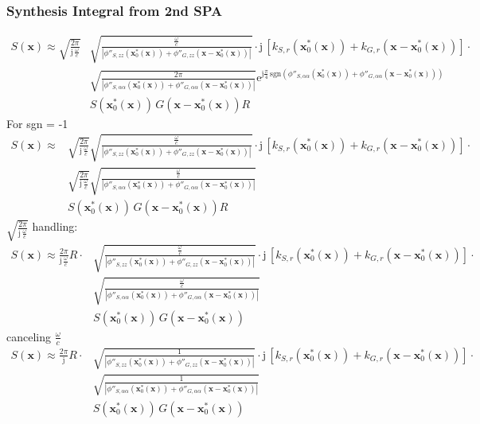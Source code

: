 \documentclass[a4paper,BCOR=15mm,10pt,twoside]{scrartcl}
\newcommand\e{\mathrm{e}}  %
\newcommand\im{\mathrm{j}}  %
\newcommand\wc{\frac{\omega}{c}}  %
\newcommand\jwc{\im\,\frac{\omega}{c}}  %
\newcommand\azx{\alpha}  %
\renewcommand{\vec}[1]{\mathbf{#1}}  %
\begin{document}
\subsubsection{Synthesis Integral from 2nd SPA}
\begin{align}
S(\vec{x}) \approx \sqrt{\frac{2\pi}{\jwc}}  
&
\sqrt{\frac{\wc}{|\phi''_{S,zz}(\vec{x}_0^*(\vec{x}))+\phi''_{G,zz}(\vec{x}-\vec{x}_0^*(\vec{x}))|}} 
\cdot \im \, \left[
k_{S,r}(\vec{x}_0^*(\vec{x})) + k_{G,r}(\vec{x} - \vec{x}_0^*(\vec{x}))
\right]\cdot\nonumber\\
&
\sqrt{\frac{2\pi}{|\phi''_{S,\azx\azx}(\vec{x}_0^*(\vec{x}))+\phi''_{G,\azx\azx}(\vec{x}-\vec{x}_0^*(\vec{x}))|}}
\e^{\im \frac{\pi}{4}\,\mathrm{sgn}(\phi''_{S,\azx\azx}(\vec{x}_0^*(\vec{x}))+\phi''_{G,\azx\azx}(\vec{x}-\vec{x}_0^*(\vec{x})))}\nonumber\\
&
S(\vec{x}_0^*(\vec{x}))\,G(\vec{x}-\vec{x}_0^*(\vec{x})) R
\end{align}
For sgn = -1
\begin{align}
S(\vec{x}) \approx 
&
\sqrt{\frac{2\pi}{\jwc}}  
\sqrt{\frac{\wc}{|\phi''_{S,zz}(\vec{x}_0^*(\vec{x}))+\phi''_{G,zz}(\vec{x}-\vec{x}_0^*(\vec{x}))|}} 
\cdot \im \, \left[
k_{S,r}(\vec{x}_0^*(\vec{x})) + k_{G,r}(\vec{x} - \vec{x}_0^*(\vec{x}))
\right]\cdot\nonumber\\
&
\sqrt{\frac{2\pi}{\jwc}}
\sqrt{\frac{\wc}{|\phi''_{S,\azx\azx}(\vec{x}_0^*(\vec{x}))+\phi''_{G,\azx\azx}(\vec{x}-\vec{x}_0^*(\vec{x}))|}}\nonumber\\
&
S(\vec{x}_0^*(\vec{x}))\,G(\vec{x}-\vec{x}_0^*(\vec{x})) R
\end{align}
$\sqrt{\frac{2\pi}{\jwc}}$ handling:
\begin{align}
S(\vec{x}) \approx \frac{2\pi}{\jwc}R \cdot
&  
\sqrt{\frac{\wc}{|\phi''_{S,zz}(\vec{x}_0^*(\vec{x}))+\phi''_{G,zz}(\vec{x}-\vec{x}_0^*(\vec{x}))|}} 
\cdot \im \, \left[
k_{S,r}(\vec{x}_0^*(\vec{x})) + k_{G,r}(\vec{x} - \vec{x}_0^*(\vec{x}))
\right]\cdot\nonumber\\
&
\sqrt{\frac{\wc}{|\phi''_{S,\azx\azx}(\vec{x}_0^*(\vec{x}))+\phi''_{G,\azx\azx}(\vec{x}-\vec{x}_0^*(\vec{x}))|}}\nonumber\\
&
S(\vec{x}_0^*(\vec{x}))\,G(\vec{x}-\vec{x}_0^*(\vec{x}))
\end{align}
canceling $\wc$ 
\begin{align}
S(\vec{x}) \approx \frac{2\pi}{\im}R \cdot
&  
\sqrt{\frac{1}{|\phi''_{S,zz}(\vec{x}_0^*(\vec{x}))+\phi''_{G,zz}(\vec{x}-\vec{x}_0^*(\vec{x}))|}} 
\cdot \im \, \left[
k_{S,r}(\vec{x}_0^*(\vec{x})) + k_{G,r}(\vec{x} - \vec{x}_0^*(\vec{x}))
\right]\cdot\nonumber\\
&
\sqrt{\frac{1}{|\phi''_{S,\azx\azx}(\vec{x}_0^*(\vec{x}))+\phi''_{G,\azx\azx}(\vec{x}-\vec{x}_0^*(\vec{x}))|}}\nonumber\\
&
S(\vec{x}_0^*(\vec{x}))\,G(\vec{x}-\vec{x}_0^*(\vec{x}))
\end{align}
\end{document}
